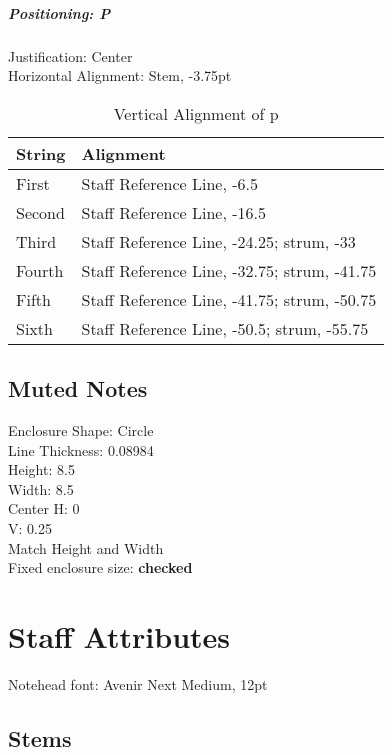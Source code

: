 \documentclass[]{memoir}
\begin{document}
\paragraph{Positioning: P}
\label{sec:positioning:-p}

Justification: Center\\
Horizontal Alignment: Stem, -3.75pt\\

\begin{table}[h!]
  \centering
  \begin{tabular}{l l}
    String & Alignment\\\hline
    First & Staff Reference Line, -6.5\\
    Second & Staff Reference Line, -16.5\\
    Third & Staff Reference Line, -24.25; strum, -33\\
    Fourth & Staff Reference Line, -32.75; strum, -41.75\\
    Fifth & Staff Reference Line, -41.75; strum, -50.75\\
    Sixth & Staff Reference Line, -50.5; strum, -55.75\\
  \end{tabular}
  \caption{Vertical Alignment of p}
  \label{tab:p}
\end{table}

\section{Muted Notes}
\label{sec:muted-notes}

Enclosure Shape: Circle\\
Line Thickness: 0.08984\\
Height: 8.5\\
Width: 8.5\\
Center H: 0\\
V: 0.25\\
Match Height and Width\\
Fixed enclosure size: \textbf{checked}

\chapter{Staff Attributes}
\label{sec:staff-attributes}

Notehead font: Avenir Next Medium, 12pt\\

\section{Stems}
\label{sec:stems}
\end{document}
